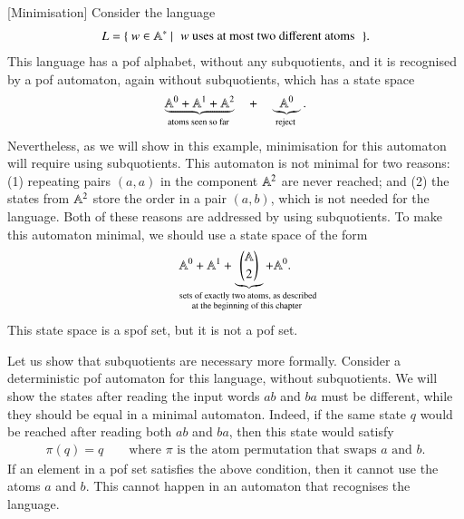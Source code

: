 \begin{myexample}\label{ex:pof-dont-minimize}[Minimisation]
    Consider the language
    \begin{align*}
    L = \setbuild{w \in \atoms^*}{\text{$w$ uses at most two different atoms}}.
    \end{align*}
    This language has a pof alphabet, without any subquotients, and it is recognised by a pof automaton, again without subquotients,  which has a state space 
    \begin{align*}
        \myunderbrace{\atoms^0+\atoms^1 + \atoms^2}{atoms seen so far}
        \quad + \quad 
        \myunderbrace{\atoms^0}{reject}.
    \end{align*}
    Nevertheless, as we will show in this example, minimisation for this automaton will require using subquotients.
    This automaton is not minimal for two reasons: (1) repeating pairs $(a,a)$ in the component $\mathbb A^2$ are never reached; and (2)  the states from $\mathbb A^2$ store the order in a pair $(a,b)$, which is not needed for the language. Both of these reasons are addressed by using subquotients.
     To make this automaton minimal, we should use a state space of the form
    \begin{align*}
    \atoms^0 + \atoms^1 + 
    \myunderbrace{\atoms \choose 2}{sets of exactly two atoms, as described \\ at the beginning of this chapter } + \atoms^0.
    \end{align*}
    This state space is a spof set, but it is not a pof set. 
    
    Let us show that subquotients are necessary more formally. Consider a deterministic pof automaton for this language, without subquotients. We will  show  the states after reading the input words $ab$ and $ba$ must be different, while they should be equal in a minimal automaton. Indeed, if the same state $q$ would be reached after reading both $ab$ and $ba$,  then this state would satisfy 
    \begin{align*}
    \pi(q) = q \qquad \text{where $\pi$ is the atom permutation that swaps $a$ and $b$}.
    \end{align*}
    If an element in a pof set satisfies the above condition, then it cannot use the atoms $a$ and $b$. This cannot happen in an automaton that recognises the language.
\end{myexample}



